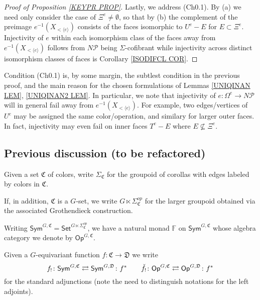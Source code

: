 \documentclass[a4paper,10pt
,draft
]{article}%
\renewcommand{\1}{\eta}%
\begin{document}
\begin{proof}[Proof of Proposition \ref{KEYPR PROP}]
Lastly, we address (Ch0.1). By (a) we need only consider the case of $\Xi^e \neq \emptyset$,
so that by (b)
the complement of
the preimage
$e^{-1}(X_{<\langle e\rangle})$
consists of the faces 
isomorphic to
$U^e-E$ for $E \subset \Xi^e$.
Injectivity of $e$ within each isomorphism class of the faces away from %
$e^{-1}(X_{<\langle e\rangle})$
follows from $N \mathcal{P}$ being $\Sigma$-cofibrant 
while injectivity across distinct isomorphism classes of faces is
Corollary \ref{ISODIFCL COR}.
\end{proof}




\begin{remark}
	Condition (Ch0.1) is, by some margin, the subtlest condition in the previous proof, and the main reason for the chosen formulations of 
	Lemmas \ref{UNIQINAN LEM}, \ref{UNIQINAN2 LEM}.
	In particular, we note that injectivity of 
	$e \colon \Omega^e \to N \mathcal{P}$ will in general fail away from 
	$e^{-1}(X_{< \langle e \rangle})$.
	For example, two edges/vertices of $U^e$
	may be assigned the same color/operation, and similary for larger outer faces. In fact, injectivity may even fail on inner faces
	$T^e-E$ where $E \not \subseteq \Xi^e$.
\end{remark}




\subsection{Previous discussion (to be refactored)}


Given a set $\mathfrak{C}$ of colors,
write $\Sigma_{\mathfrak{C}}$ for the groupoid of corollas with edges labeled by colors in $\mathfrak{C}$.

If, in addition, $\mathfrak{C}$ is a $G$-set, 
we write $G \ltimes \Sigma_{\mathfrak{C}}^{op}$ for the larger groupoid obtained via the associated Grothendieck construction.



Writing
$\mathsf{Sym}^{G,\mathfrak{C}} = 
\mathsf{Set}^{G \ltimes \Sigma_{\mathfrak{C}}^{op}}$,
we have a natural monad $\mathbb{F}$ on
$\mathsf{Sym}^{G,\mathfrak{C}}$
whose algebra category we denote by 
$\mathsf{Op}^{G,\mathfrak{C}}$.


\begin{notation}
	Given a $G$-equivariant function 
	$f \colon \mathfrak{C} \to \mathfrak{D}$
	we write
\[
	f_{!} \colon 
	\mathsf{Sym}^{G,\mathfrak{C}}
	\rightleftarrows
	\mathsf{Sym}^{G,\mathfrak{D}}
	\colon f^{\**}
\qquad
	\check{f}_{!} \colon 
	\mathsf{Op}^{G,\mathfrak{C}}
	\rightleftarrows
	\mathsf{Op}^{G,\mathfrak{D}}
	\colon f^{\**}
\]
for the standard adjunctions (note the need to distinguish notations for the left adjoints).
\end{notation}
\end{document}
